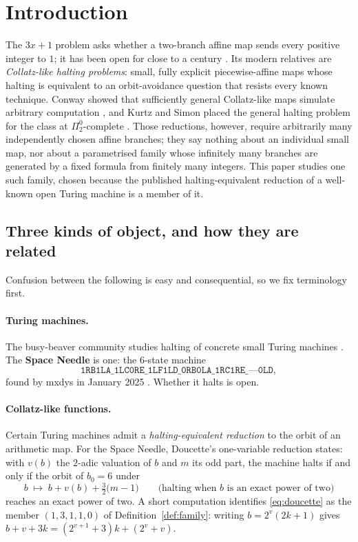 \documentclass[11pt]{article}
\theoremstyle{definition}
\theoremstyle{remark}
\begin{document}
\tableofcontents

\section{Introduction}

The $3x+1$ problem asks whether a two-branch affine map sends every positive
integer to $1$; it has been open for close to a century
\cite{lagarias-monthly,lagarias-overview}.  Its modern relatives are
\emph{Collatz-like halting problems}: small, fully explicit piecewise-affine
maps whose halting is equivalent to an orbit-avoidance question that resists
every known technique.  Conway showed that sufficiently general Collatz-like
maps simulate arbitrary computation \cite{conway72}, and Kurtz and Simon placed
the general halting problem for the class at $\Pi^0_2$-complete
\cite{kurtz-simon}.  Those reductions, however, require arbitrarily many
independently chosen affine branches; they say nothing about an individual
small map, nor about a parametrised family whose infinitely many branches are
generated by a fixed formula from finitely many integers.  This paper studies
one such family, chosen because the published halting-equivalent reduction of a
well-known open Turing machine is a member of it.

\subsection{Three kinds of object, and how they are related}
\label{sec:objects}

Confusion between the following is easy and consequential, so we fix
terminology first.

\paragraph{Turing machines.}
The busy-beaver community studies halting of concrete small Turing machines
\cite{bbchallenge-cryptids}.  The \textbf{Space Needle} is one: the $6$-state
machine
\[
\texttt{1RB1LA\_1LC0RE\_1LF1LD\_0RB0LA\_1RC1RE\_---0LD},
\]
found by mxdys in January 2025 \cite{bbchallenge-needle}.  Whether it halts is
open.

\paragraph{Collatz-like functions.}
Certain Turing machines admit a \emph{halting-equivalent reduction} to the
orbit of an arithmetic map.  For the Space Needle, Doucette's one-variable
reduction \cite{bbchallenge-needle} states: with $v(b)$ the $2$-adic valuation
of $b$ and $m$ its odd part, the machine halts if and only if the orbit of
$b_0=6$ under
\begin{equation}\label{eq:doucette}
b \;\longmapsto\; b + v(b) + \tfrac{3}{2}\bigl(m-1\bigr)
\qquad\text{(halting when $b$ is an exact power of two)}
\end{equation}
reaches an exact power of two.  A short computation identifies
\eqref{eq:doucette} as the member $(1,3,1,1,0)$ of
Definition~\ref{def:family}: writing $b=2^{v}(2k+1)$ gives
$b+v+3k=(2^{v+1}+3)k+(2^{v}+v)$.
\end{document}
